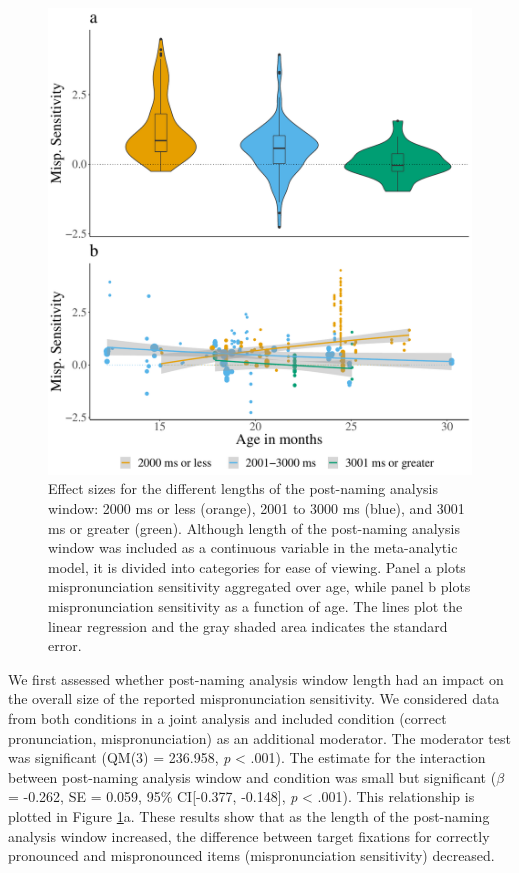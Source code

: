 \documentclass[man]{apa6}
\begin{document}
\begin{figure}
\centering
\includegraphics{VonHolzenBergmann_MPMetaAnalysis_files/figure-latex/PlotPostNameCondAge-1.pdf}
\caption{\label{fig:PlotPostNameCondAge}Effect sizes for the different lengths of the post-naming analysis window: 2000 ms or less (orange), 2001 to 3000 ms (blue), and 3001 ms or greater (green). Although length of the post-naming analysis window was included as a continuous variable in the meta-analytic model, it is divided into categories for ease of viewing. Panel a plots mispronunciation sensitivity aggregated over age, while panel b plots mispronunciation sensitivity as a function of age. The lines plot the linear regression and the gray shaded area indicates the standard error.}
\end{figure}

We first assessed whether post-naming analysis window length had an impact on the overall size of the reported mispronunciation sensitivity. We considered data from both conditions in a joint analysis and included condition (correct pronunciation, mispronunciation) as an additional moderator. The moderator test was significant (QM(3) = 236.958, \emph{p} \textless{} .001). The estimate for the interaction between post-naming analysis window and condition was small but significant (\(\beta\) = -0.262, SE = 0.059, 95\% CI{[}-0.377, -0.148{]}, \emph{p} \textless{} .001). This relationship is plotted in Figure \ref{fig:PlotPostNameCondAge}a. These results show that as the length of the post-naming analysis window increased, the difference between target fixations for correctly pronounced and mispronounced items (mispronunciation sensitivity) decreased.
\end{document}
